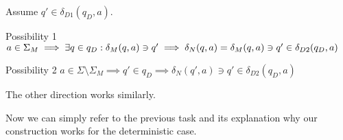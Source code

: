 Assume $q' \in \delta_{D1}(q_D,a)$.

Possibility 1 $a \in \Sigma_M \implies \exists q \in q_D : \delta_M(q,a)\ni q' \\\implies \delta_N(q,a)=\delta_M(q,a) \ni q' \in \delta_{D2}(q_D,a)$

Possibility 2 $a \in \Sigma \setminus \Sigma_M \implies q' \in q_D \implies \delta_N(q',a)\ni q' \in \delta_{D2}(q_D,a)$

The other direction works similarly.

Now we can simply refer to the previous task and its explanation why our construction works for the deterministic case.